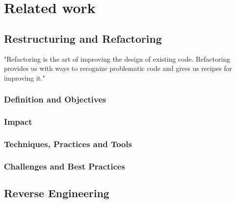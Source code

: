 
%

\chapter{Related work}
\label{cha:Related work}
    




\section{Restructuring and Refactoring}

"Refactoring is the art of improving the design of existing code. Refactoring provides us with ways to recognize problematic code and gives us recipes for improving it." \cite{wake2004refactoring} 

\cite{RefactoringFowler2002} \cite{SurveyRefactoring2004} \cite{estructuringArnold1989}

    
\subsection{Definition and Objectives}

\subsection{Impact}

\subsection{Techniques, Practices and Tools}

\subsection{Challenges and Best Practices}










\section{Reverse Engineering}
\cite{ReverseEngineering2011} \cite{ReverseEngineering2005} \cite{ReverseEngineering1990}




